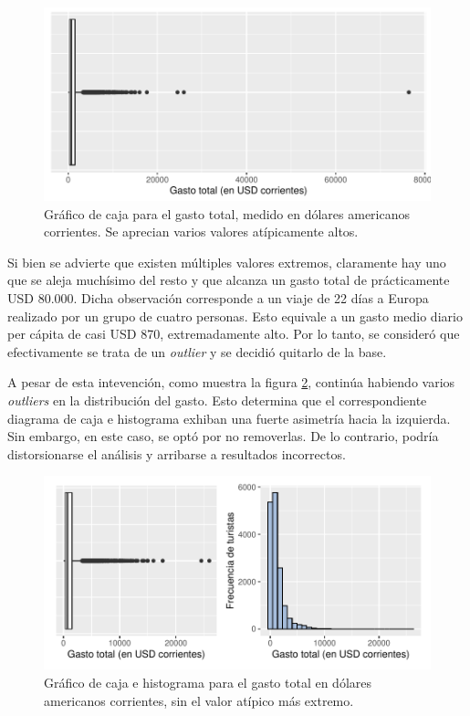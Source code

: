 \documentclass[
]{article}
\begin{document}
\begin{figure}[H]

{\centering \includegraphics{Informe-Proyectofinal_files/figure-latex/boxplot_gasto-1} 

}

\caption{Gráfico de caja para el gasto total, medido en dólares americanos corrientes. Se aprecian varios valores atípicamente altos.}\label{fig:boxplot_gasto}
\end{figure}

Si bien se advierte que existen múltiples valores extremos, claramente
hay uno que se aleja muchísimo del resto y que alcanza un gasto total de
prácticamente USD 80.000. Dicha observación corresponde a un viaje de 22
días a Europa realizado por un grupo de cuatro personas. Esto equivale a
un gasto medio diario per cápita de casi USD 870, extremadamente alto.
Por lo tanto, se consideró que efectivamente se trata de un
\emph{outlier} y se decidió quitarlo de la base.

A pesar de esta intevención, como muestra la figura
\ref{fig:sin_outliers}, continúa habiendo varios \emph{outliers} en la
distribución del gasto. Esto determina que el correspondiente diagrama
de caja e histograma exhiban una fuerte asimetría hacia la izquierda.
Sin embargo, en este caso, se optó por no removerlas. De lo contrario,
podría distorsionarse el análisis y arribarse a resultados incorrectos.

\begin{figure}[H]

{\centering \includegraphics{Informe-Proyectofinal_files/figure-latex/sin_outliers-1} 

}

\caption{Gráfico de caja e histograma para el gasto total en dólares americanos corrientes, sin el valor atípico más extremo.}\label{fig:sin_outliers}
\end{figure}
\end{document}
